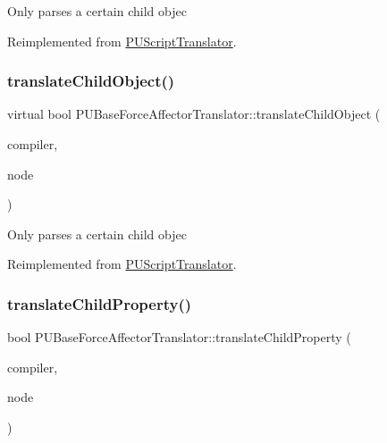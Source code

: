 Only parses a certain child objec 

Reimplemented from \hyperlink{classPUScriptTranslator_ab587d01348ae3e678cb700c719b2b113}{P\+U\+Script\+Translator}.

\mbox{\label{classPUBaseForceAffectorTranslator_a2703835c30b64091e9dd72077e1999a9}} 
\subsubsection{\texorpdfstring{translate\+Child\+Object()}{translateChildObject()}\hspace{0.1cm}{\footnotesize\ttfamily [2/2]}}
{\footnotesize\ttfamily virtual bool P\+U\+Base\+Force\+Affector\+Translator\+::translate\+Child\+Object (\begin{DoxyParamCaption}\item[{\hyperlink{classPUScriptCompiler}{P\+U\+Script\+Compiler} $\ast$}]{compiler,  }\item[{\hyperlink{classPUAbstractNode}{P\+U\+Abstract\+Node} $\ast$}]{node }\end{DoxyParamCaption})\hspace{0.3cm}{\ttfamily [virtual]}}

Only parses a certain child objec 

Reimplemented from \hyperlink{classPUScriptTranslator_ab587d01348ae3e678cb700c719b2b113}{P\+U\+Script\+Translator}.

\mbox{\label{classPUBaseForceAffectorTranslator_a70700116d55fa4854571c99794debd92}} 
\subsubsection{\texorpdfstring{translate\+Child\+Property()}{translateChildProperty()}\hspace{0.1cm}{\footnotesize\ttfamily [1/2]}}
{\footnotesize\ttfamily bool P\+U\+Base\+Force\+Affector\+Translator\+::translate\+Child\+Property (\begin{DoxyParamCaption}\item[{\hyperlink{classPUScriptCompiler}{P\+U\+Script\+Compiler} $\ast$}]{compiler,  }\item[{\hyperlink{classPUAbstractNode}{P\+U\+Abstract\+Node} $\ast$}]{node }\end{DoxyParamCaption})\hspace{0.3cm}{\ttfamily [virtual]}}

